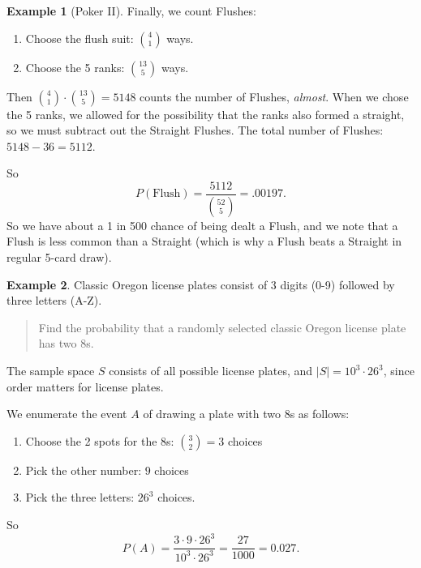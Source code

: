 \documentclass[
]{book}
\providecommand{\tightlist}{%
  \setlength{\itemsep}{0pt}\setlength{\parskip}{0pt}}
\theoremstyle{definition}
\theoremstyle{definition}
\newtheorem{example}{Example}[chapter]
\theoremstyle{definition}
\theoremstyle{definition}
\theoremstyle{remark}
\begin{document}
\begin{example}[Poker II]
Finally, we count Flushes:

\begin{enumerate}
\def\labelenumi{\arabic{enumi}.}
\tightlist
\item
  Choose the flush suit: \(\binom{4}{1}\) ways.
\item
  Choose the 5 ranks: \(\binom{13}{5}\) ways.
\end{enumerate}

Then \(\displaystyle \binom{4}{1} \cdot \binom{13}{5} = 5148\) counts the number of Flushes, \emph{almost}. When we chose the 5 ranks, we allowed for the possibility that the ranks also formed a straight, so we must subtract out the Straight Flushes. The total number of Flushes: \(5148 - 36 = 5112.\)

So \[P(\text{Flush}) = \frac{5112}{\binom{52}{5}} = .00197.\]
So we have about a 1 in 500 chance of being dealt a Flush, and we note that a Flush is less common than a Straight (which is why a Flush beats a Straight in regular 5-card draw).

\end{example}

\begin{example}
\protect\hypertarget{exm:license-plates}{}\label{exm:license-plates}Classic Oregon license plates consist of 3 digits (0-9) followed by three letters (A-Z).

\begin{quote}
Find the probability that a randomly selected classic Oregon license plate has two 8s.
\end{quote}

The sample space \(S\) consists of all possible license plates, and \(|S| = 10^3\cdot 26^3\), since order matters for license plates.

We enumerate the event \(A\) of drawing a plate with two 8s as follows:

\begin{enumerate}
\def\labelenumi{\arabic{enumi}.}
\tightlist
\item
  Choose the 2 spots for the 8s: \(\binom{3}{2} = 3\) choices
\item
  Pick the other number: \(9\) choices
\item
  Pick the three letters: \(26^3\) choices.
\end{enumerate}

So \[P(A) = \frac{3 \cdot 9 \cdot 26^3}{10^3\cdot 26^3} = \frac{27}{1000} = 0.027.\]
\end{example}
\end{document}
